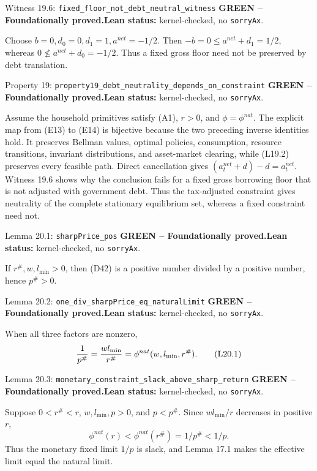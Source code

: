 \documentclass[11pt]{article}
\newcommand{\leanname}[1]{\nolinkurl{#1}}
\newcommand{\eqL}[1]{\refstepcounter{equation}\tag{L#1}}
\newcommand{\formalcheck}{\textbf{Lean status:} kernel-checked, no \texttt{sorryAx}.}
\newcommand{\greenstatus}{\textcolor{proved}{\textbf{GREEN -- Foundationally proved.}}}
\begin{document}
\begin{greenbox}{Witness 19.6: \leanname{fixed_floor_not_debt_neutral_witness}}
\greenstatus\quad\formalcheck

Choose \(b=0,d_0=0,d_1=1,a^{net}=-1/2\).  Then
\(-b=0\le a^{net}+d_1=1/2\), whereas
\(0\nleq a^{net}+d_0=-1/2\).  Thus a fixed gross floor need not be preserved
by debt translation.
\end{greenbox}

\begin{greenbox}{Property 19: \leanname{property19_debt_neutrality_depends_on_constraint}}
\greenstatus\quad\formalcheck

Assume the household primitives satisfy (A1), \(r>0\), and
\(\phi=\phi^{nat}\).  The explicit map from (E13) to
(E14) is bijective because the two preceding inverse identities hold.  It
preserves Bellman values, optimal policies, consumption, resource transitions,
invariant distributions, and asset-market clearing, while (L19.2) preserves
every feasible path.  Direct cancellation gives
\((a_t^{net}+d)-d=a_t^{net}\).  Witness 19.6 shows why the conclusion fails
for a fixed gross borrowing floor that is not adjusted with government debt.
Thus the tax-adjusted constraint gives neutrality of the complete stationary
equilibrium set, whereas a fixed constraint need not.
\end{greenbox}

\begin{greenbox}{Lemma 20.1: \leanname{sharpPrice_pos}}
\greenstatus\quad\formalcheck

If \(r^\#,w,l_{\min}>0\), then (D42) is a positive number divided by a
positive number, hence \(p^\#>0\).
\end{greenbox}

\begin{greenbox}{Lemma 20.2: \leanname{one_div_sharpPrice_eq_naturalLimit}}
\greenstatus\quad\formalcheck

When all three factors are nonzero,
\begin{equation}
 \frac1{p^\#}=\frac{wl_{\min}}{r^\#}=\phi^{nat}(w,l_{\min},r^\#). \eqL{20.1}\label{L20.1}
\end{equation}
\end{greenbox}

\begin{greenbox}{Lemma 20.3: \leanname{monetary_constraint_slack_above_sharp_return}}
\greenstatus\quad\formalcheck

Suppose \(0<r^\#<r\), \(w,l_{\min},p>0\), and \(p<p^\#\).  Since
\(wl_{\min}/r\) decreases in positive \(r\),
\[
 \phi^{nat}(r)<\phi^{nat}(r^\#)=1/p^\#<1/p.
\]
Thus the monetary fixed limit \(1/p\) is slack, and Lemma 17.1 makes the
effective limit equal the natural limit.
\end{greenbox}
\end{document}
